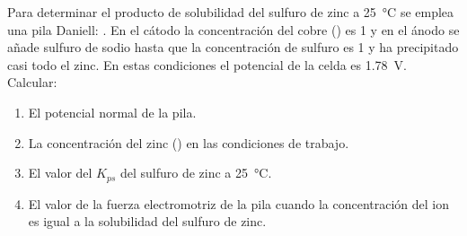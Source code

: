 Para determinar el producto de solubilidad del sulfuro de zinc a \SI{25}{\celsius} se emplea una pila Daniell:
. En el cátodo la concentración del cobre () es \SI{1}{\Molar} y en el ánodo se añade sulfuro de
sodio hasta que la concentración de sulfuro es \SI{1}{\Molar} y ha precipitado casi todo el zinc. En estas condiciones el
potencial de la celda es \SI{1,78}{\volt}. Calcular:
\begin{enumerate}[label={\alph*)},font={\color{red!50!black}\bfseries}]
    \item El potencial normal de la pila.
    \item La concentración del zinc () en las condiciones de trabajo.
    \item El valor del $K_{ps}$ del sulfuro de zinc a \SI{25}{\celsius}.
    \item El valor de la fuerza electromotriz de la pila cuando la concentración del ion  es igual a la solubilidad del sulfuro de zinc.
\end{enumerate}
